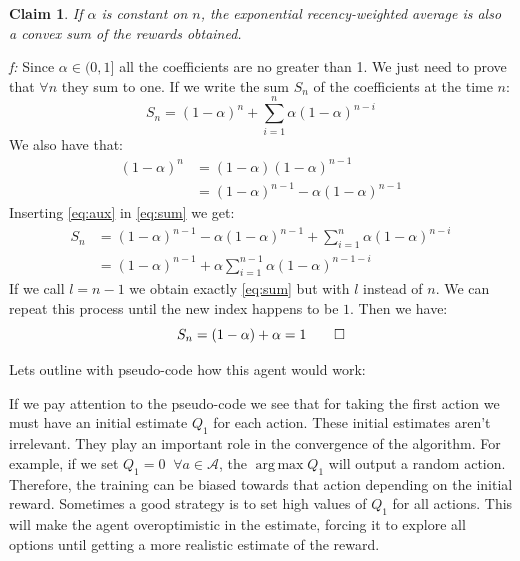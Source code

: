 \documentclass[11pt,a4paper,twoside]{report}
\DeclareMathOperator*{\argmax}{arg\,max}
\newcommand{\+}{\textnormal{+} }
\newtheorem{myclaim}[mythm]{Claim}
\theoremstyle{definition}
\numberwithin{equation}{chapter}
\begin{document}
\begin{myclaim}

  If $\alpha$ is constant on $n$, the exponential recency-weighted average is
  also a convex sum of the rewards obtained.
  \\
\end{myclaim}
  \textit{f:} Since $\alpha \in (0,1]$ all the coefficients are no greater
  than 1. We just need to prove that $\forall n$ they sum to one. If we write 
  the sum $S_n$ of the coefficients at the time $n$:
  \begin{equation}
    S_n=(1-\alpha)^{n} + \sum_{i=1}^{n} \alpha(1-\alpha)^{n-i}
    \label{eq:sum}
  \end{equation}
  We also have that: 
  \begin{align}
    (1-\alpha)^n &= (1-\alpha)(1-\alpha)^{n-1} \\
    &=(1-\alpha)^{n-1}-\alpha(1-\alpha)^{n-1}
    \label{eq:aux}
  \end{align}
  Inserting \eqref{eq:aux} in \eqref{eq:sum} we get:
  \begin{align}
    S_n&=(1-\alpha)^{n-1}-\alpha(1-\alpha)^{n-1}+\sum_{i=1}^{n} \alpha(1-\alpha)^{n-i}\\
    &=(1-\alpha)^{n-1} + \alpha \sum_{i=1}^{n-1} \alpha(1-\alpha)^{n-1-i}
  \end{align}
  If we call $l=n-1$ we obtain exactly \eqref{eq:sum} but with $l$ instead of 
  $n$. We can repeat this process until the new index happens to be $1$. Then
  we have:
  \begin{equation}
  S_n = (1-\alpha) + \alpha = 1 \qed 
\end{equation}

Lets outline with pseudo-code how this agent would work:

\makeatletter
\def\BState{\State\hskip-\ALG@thistlm}
\makeatother
\begin{algorithm}
  \caption{}\label{Non-stationary multiarmed-bandit}
  \end{algorithm}

  If we pay attention to the pseudo-code we see that for taking the first action
  we must have an initial estimate $Q_1$ for each action. These initial
  estimates aren't irrelevant. They play an important role in the convergence of
  the algorithm. For example, if we set $Q_1=0 \; \; \forall a \in \mathcal{A}$,
  the $\argmax Q_1$ will output a random action. Therefore, the training can be
  biased towards that action depending on the initial reward. Sometimes a good
  strategy is to set high values of $Q_1$ for all actions. This will make the
  agent overoptimistic in the estimate, forcing it to explore all options until
  getting a more realistic estimate of the reward.
\end{document}
